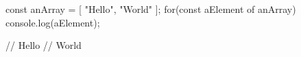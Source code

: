 const anArray = [
    "Hello",
    "World"
];
for(const aElement of anArray){
    console.log(aElement);
}

// Hello
// World